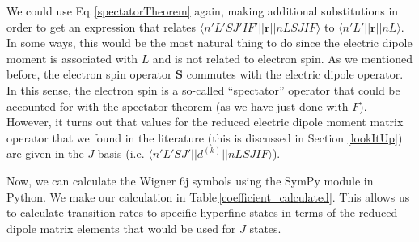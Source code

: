 We could use Eq.\,\ref{spectatorTheorem} again, making additional substitutions in order to get an expression that relates $\langle n' L' S J' I F' ||\mathbf{r}||n L S J I F\rangle$ to $\langle n' L'||\mathbf{r}||n L \rangle$. In some ways, this would be the most natural thing to do since the electric dipole moment is associated with $L$ and is not related to electron spin. As we mentioned before, the electron spin operator $\mathbf{S}$ commutes with the electric dipole operator. In this sense, the electron spin is a so-called ``spectator'' operator that could be accounted for with the spectator theorem (as we have just done with $F$). However, it turns out that values for the reduced electric dipole moment matrix operator that we found in the literature (this is discussed in Section \ref{lookItUp}) are given in the $J$ basis (i.e. $\langle n'L'S J'||d^{(k)}||n L S J I F\rangle$).

%
%
%

Now, we can calculate the Wigner 6j symbols using the SymPy module in Python\cite{sympy}\cite{rasch6j}.
We make our calculation in Table\,\ref{coefficient_calculated}. %
This allows us to calculate transition rates to specific hyperfine states in terms of the reduced dipole matrix elements that would be used for $J$ states.

